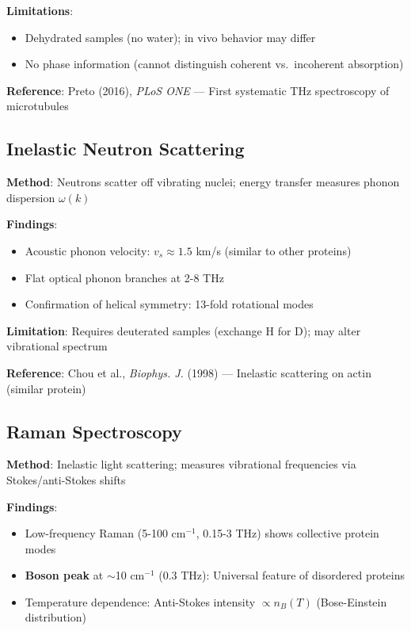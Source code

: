 \textbf{Limitations}:
\begin{itemize}
\item Dehydrated samples (no water); in vivo behavior may differ
\item No phase information (cannot distinguish coherent vs.~incoherent absorption)
\end{itemize}

\textbf{Reference}: Preto (2016), \emph{PLoS ONE} --- First
systematic THz spectroscopy of microtubules

\subsection{Inelastic Neutron Scattering}\label{inelastic-neutron-scattering-established}

\textbf{Method}: Neutrons scatter off vibrating nuclei; energy transfer
measures phonon dispersion \(\omega(k)\)

\textbf{Findings}:
\begin{itemize}
\item Acoustic phonon velocity: $v_s \approx 1.5$ km/s (similar to other proteins)
\item Flat optical phonon branches at 2-8 THz
\item Confirmation of helical symmetry: 13-fold rotational modes
\end{itemize}

\textbf{Limitation}: Requires deuterated samples (exchange H for D); may
alter vibrational spectrum

\textbf{Reference}: Chou et al., \emph{Biophys. J.} (1998) ---
Inelastic scattering on actin (similar protein)

\subsection{Raman Spectroscopy}\label{raman-spectroscopy-established}

\textbf{Method}: Inelastic light scattering; measures vibrational
frequencies via Stokes/anti-Stokes shifts

\textbf{Findings}:
\begin{itemize}
\item Low-frequency Raman (5-100 cm$^{-1}$, 0.15-3 THz) shows collective protein modes
\item \textbf{Boson peak} at $\sim$10 cm$^{-1}$ (0.3 THz): Universal feature of disordered proteins
\item Temperature dependence: Anti-Stokes intensity $\propto n_B(T)$ (Bose-Einstein distribution)
\end{itemize}


